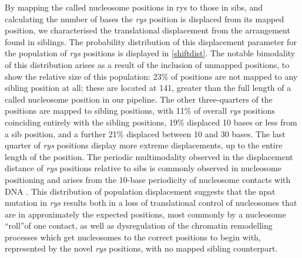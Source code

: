 \documentclass{ut-thesis}
\begin{document}
\begin{NoHyper}
By mapping the called nucleosome positions in rys to those in sibs, and calculating the number of bases the \textit{rys} position is displaced from its mapped position, we characterised the translational displacement from the arrangement found in siblings. The probability distribution of this displacement parameter for the population of \textit{rys} positions is displayed in \autoref{shiftdist}. The notable bimodality of this distribution arises as a result of the inclusion of unmapped positions, to show the relative size of this population: 23\% of positions are not mapped to any sibling position at all; these are located at 141, greater than the full length of a called nucleosome position in our pipeline. The other three-quarters of the positions are mapped to sibling positions, with 11\% of overall \textit{rys} positions coinciding entirely with the sibling positions, 19\% displaced 10 bases or less from a sib position, and a further 21\% displaced between 10 and 30 bases. The last quarter of \textit{rys} positions display more extreme displacements, up to the entire length of the position. The periodic multimodality observed in the displacement distance of \textit{rys} positions relative to sibs is commonly observed in nucleosome positioning and arises from the 10-base periodicity of nucleosome contacts with DNA \cite{Wright2017}. This distribution of population displacement suggests that the npat mutation in \textit{rys} results both in a loss of translational control of nucleosomes that are in approximately the expected positions, most commonly by a nucleosome ``roll''of one contact, as well as dysregulation of the chromatin remodelling processes which get nucleosomes to the correct positions to begin with, represented by the novel \textit{rys} positions, with no mapped sibling counterpart.


\end{NoHyper}
\end{document}
